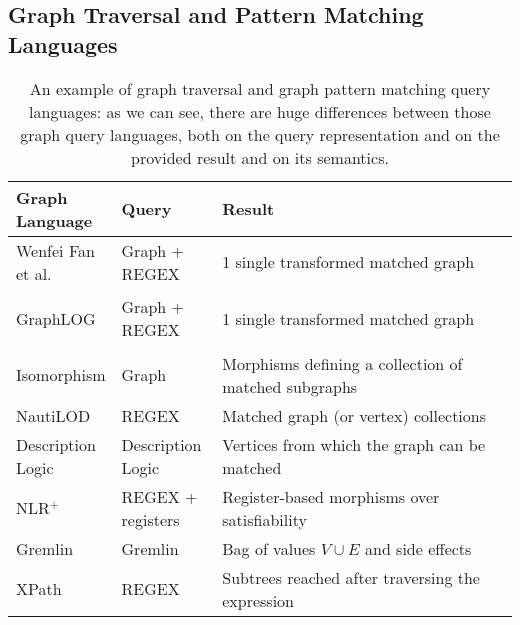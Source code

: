 

\subsection{Graph Traversal and Pattern Matching Languages}\label{sec:gtl}
\begin{table}
	\centering
\hspace*{-1cm}
\begin{tabularx}{\textwidth}{m{0.2\linewidth}|m{0.2\linewidth}|m{0.7\linewidth}}
	\toprule
	Graph Language & Query & Result \\
	\midrule
	Wenfei Fan et al. \cite{n3} & Graph + REGEX & 1 single transformed matched graph\\\hline
	GraphLOG \par \cite{consens1990a,GraphLogAggr} & Graph + REGEX & 1 single transformed matched graph\\\hline
	Isomorphism & Graph & Morphisms defining a collection of matched sub\-graphs\\\hline
	NautiLOD \cite{NautiLOD} & REGEX & Matched graph (or vertex) collections\\\hline
	Description Logic \cite{BotoevaCCRX16, Baader2010} & Description Logic & Vertices from which the graph can be matched\\\hline
	NLR$^+$ \cite{Barcelo2013} & REGEX + registers & Register-based morphisms over satisfiability \\\hline
	Gremlin \cite{Rodriguez15} & Gremlin & Bag of values $V\cup E$ and side effects\\\hline
	XPath \cite{xpath31} & REGEX & Subtrees reached after traversing the expression\\
	\bottomrule
\end{tabularx}
\caption{An example of graph traversal and graph pattern matching query languages: as we can see, there are huge differences between those graph query languages, both on the query representation and on the provided result and on its semantics.}
\label{tab:messedtables}
\end{table}

